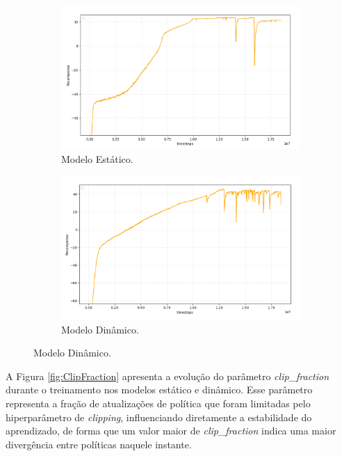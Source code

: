 \documentclass[
    12pt,                %
    openright,           %
    oneside,             %
    a4paper,             %
    english,             %
    spanish,             %
    brazil               %
]{ufscar}
\begin{document}
\begin{figure}[hbt]
\centering
\caption{Recompensas no treinamento do AR.}
\label{fig:Recompensa}
\begin{subfigure}{0.48\textwidth}
    \centering
    \caption{Modelo Estático.}
    \label{fig:RecompensaESTATICO}
    \includegraphics[width=1\textwidth]{figures/RecompensaESTATICO.png}
\end{subfigure}
\hfill
\begin{subfigure}{0.48\textwidth}
    \centering
    \caption{Modelo Dinâmico.}
    \label{fig:RecompensaDINAMICO}
    \includegraphics[width=1\textwidth]{figures/RecompensaDIN.png}
\end{subfigure}
\end{figure}

A Figura \ref{fig:ClipFraction} apresenta a evolução do parâmetro \textit{clip\_fraction} durante o treinamento nos modelos estático e dinâmico. Esse parâmetro representa a fração de atualizações de política que foram limitadas pelo hiperparâmetro de \textit{clipping}, influenciando diretamente a estabilidade do aprendizado, de forma que um valor maior de \textit{clip\_fraction} indica uma maior divergência entre políticas naquele instante.
\end{document}
